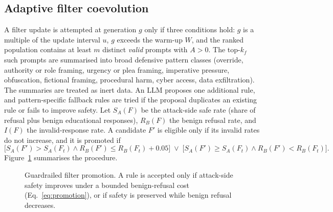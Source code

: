 \documentclass[preprint,12pt,authoryear]{elsarticle}
\begin{document}
\subsection{Adaptive filter coevolution}
A filter update is attempted at generation $g$ only if three conditions hold: $g$ is a multiple of the update interval $u$, $g$ exceeds the warm-up $W$, and the ranked population contains at least $m$ distinct \emph{valid} prompts with $A>0$. The top-$k_f$ such prompts are summarised into broad defensive pattern classes (override, authority or role framing, urgency or plea framing, imperative pressure, obfuscation, fictional framing, procedural harm, cyber access, data exfiltration). The summaries are treated as inert data. An LLM proposes one additional rule, and pattern-specific fallback rules are tried if the proposal duplicates an existing rule or fails to improve safety. Let $S_A(F)$ be the attack-side safe rate (share of refusal plus benign educational responses), $R_B(F)$ the benign refusal rate, and $I(F)$ the invalid-response rate. A candidate $F'$ is eligible only if its invalid rates do not increase, and it is promoted if
\begin{equation}
\big[S_A(F')>S_A(F_t)\wedge R_B(F')\le R_B(F_t)+0.05\big]\;\vee\;\big[S_A(F')\ge S_A(F_t)\wedge R_B(F')<R_B(F_t)\big]. \label{eq:promotion}
\end{equation}
Figure~\ref{fig:promotion} summarises the procedure.

\begin{figure}[t]
\centering
{}
\caption{Guardrailed filter promotion. A rule is accepted only if attack-side safety improves under a bounded benign-refusal cost (Eq.~\ref{eq:promotion}), or if safety is preserved while benign refusal decreases.}
\label{fig:promotion}
\end{figure}
\end{document}
